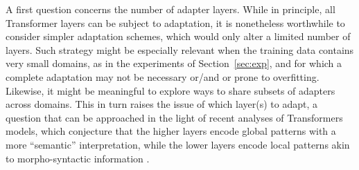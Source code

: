 \documentclass[11pt,a4paper]{article}
\newcommand{\fyTodo}[1]{\Todo[FY:]{\textcolor{orange}{#1}}}
\newcommand{\domain}[1]{\texttt{\textsc{#1}}}
\begin{document}
A first question concerns the number of adapter layers. While in principle, all Transformer layers can be subject to adaptation, it is nonetheless worthwhile to consider simpler adaptation schemes, which would only alter a limited number of layers. Such strategy might be especially relevant when the training data contains very small domains, as in the experiments of Section~\ref{sec:exp}, and for which a complete adaptation may not be necessary or/and or prone to overfitting. Likewise, it might be meaningful to explore ways to share subsets of adapters across domains. This in turn raises the issue of which layer(s) to adapt, a question that can be approached in the light of recent analyses of Transformers models, which conjecture that the higher layers encode global patterns with a more ``semantic'' interpretation, while the lower layers encode local patterns akin to morpho-syntactic information \cite{raganato18analysis}.

\end{document}
